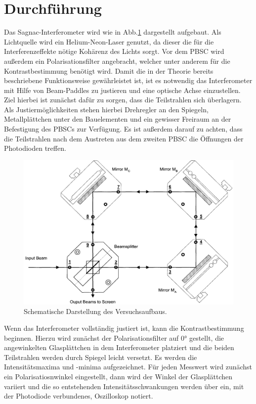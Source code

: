 \section{Durchführung}
Das Sagnac-Interferometer wird wie in Abb.\ref{aufbau} dargestellt aufgebaut. Als Lichtquelle wird ein Helium-Neon-Laser genutzt, da dieser die für die Interferenzeffekte nötige Kohärenz des Lichts sorgt.
Vor dem PBSC wird außerdem ein Polarisationsfilter angebracht, welcher unter anderem für die Kontrastbestimmung benötigt wird. Damit die in der Theorie bereits beschriebene Funktionsweise gewährleistet ist,
ist es notwendig das Interferometer mit Hilfe von Beam-Paddles zu justieren und eine optische Achse einzustellen. Ziel hierbei ist zunächst dafür zu sorgen, dass die Teilstrahlen sich überlagern. Als Justiermöglichkeiten
stehen hierbei Drehregler an den Spiegeln, Metallplättchen unter den Bauelementen und ein gewisser Freiraum an der Befestigung des PBSCs zur Verfügung. Es ist außerdem darauf zu achten, dass die Teilstrahlen
nach dem Austreten aus dem zweiten PBSC die Öffnungen der Photodioden treffen.
\begin{figure}[H]
  \centering
  \includegraphics[scale=0.4]{Bilder/skizze2.png}
  \caption{Schematische Darstellung des Versuchsaufbaus.\cite{anleitung}}
  \label{aufbau}
\end{figure}
Wenn das Interferometer vollständig justiert ist, kann die Kontrastbestimmung beginnen. Hierzu wird zunächst der Polarisationsfilter auf $0°$ gestellt, die angewinkelten Glasplättchen in dem Interferometer platziert
und die beiden Teilstrahlen werden durch Spiegel leicht versetzt.
Es werden die Intensitätsmaxima und -minima aufgezeichnet. Für jeden Messwert wird zunächst ein Polarisatiosnwinkel eingestellt, dann wird der Winkel der Glasplättchen variiert und die so entstehenden
Intensitätsschwankungen werden über ein, mit der Photodiode verbundenes, Oszilloskop notiert.
